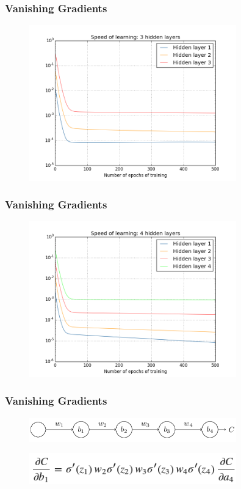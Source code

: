 \documentclass{beamer}
\begin{document}
\begin{frame}
	\frametitle{Vanishing Gradients}
	
	\begin{figure}
		\includegraphics[width=0.8\textwidth]{imgs/training_speed_3_layers}
	\end{figure}
\end{frame}


\begin{frame}
	\frametitle{Vanishing Gradients}
	
	\begin{figure}
		\includegraphics[width=0.8\textwidth]{imgs/training_speed_4_layers}
	\end{figure}
\end{frame}


\begin{frame}
	\frametitle{Vanishing Gradients}
	
	\begin{figure}
		\includegraphics[width=0.8\textwidth]{imgs/chaining}
	\end{figure}
	
		
	\begin{figure}
		\includegraphics[width=0.8\textwidth]{imgs/chaining_equation}
	\end{figure}
\end{frame}
\end{document}
